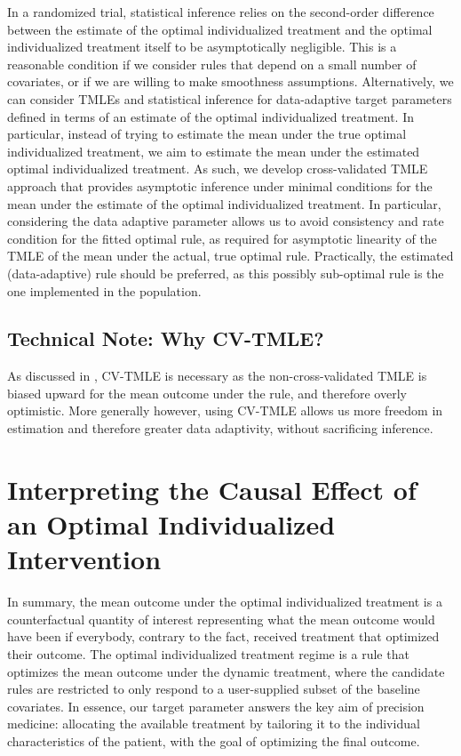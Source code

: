 \documentclass[
  12pt, krantz2,
]{krantz}
\newcommand{\1}{\mathbbm{1}}
\theoremstyle{definition}
\theoremstyle{definition}
\theoremstyle{definition}
\theoremstyle{definition}
\theoremstyle{remark}
\begin{document}
In a randomized trial, statistical inference relies on the second-order
difference between the estimate of the optimal individualized treatment and the
optimal individualized treatment itself to be asymptotically negligible. This is
a reasonable condition if we consider rules that depend on a small number of
covariates, or if we are willing to make smoothness assumptions. Alternatively,
we can consider TMLEs and statistical inference for data-adaptive target
parameters defined in terms of an estimate of the optimal individualized
treatment. In particular, instead of trying to estimate the mean under the true
optimal individualized treatment, we aim to estimate the mean under the
estimated optimal individualized treatment. As such, we develop cross-validated
TMLE approach that provides asymptotic inference under minimal conditions for
the mean under the estimate of the optimal individualized treatment. In
particular, considering the data adaptive parameter allows us to avoid
consistency and rate condition for the fitted optimal rule, as required for
asymptotic linearity of the TMLE of the mean under the actual, true optimal
rule. Practically, the estimated (data-adaptive) rule should be preferred, as
this possibly sub-optimal rule is the one implemented in the population.

\hypertarget{technical-note-why-cv-tmle}{%
\subsection{Technical Note: Why CV-TMLE?}\label{technical-note-why-cv-tmle}}

As discussed in \citet{vanderLaanLuedtke15}, CV-TMLE is necessary as the
non-cross-validated TMLE is biased upward for the mean outcome under the rule,
and therefore overly optimistic. More generally however, using CV-TMLE allows us
more freedom in estimation and therefore greater data adaptivity, without
sacrificing inference.

\hypertarget{interpreting-the-causal-effect-of-an-optimal-individualized-intervention}{%
\section{Interpreting the Causal Effect of an Optimal Individualized Intervention}\label{interpreting-the-causal-effect-of-an-optimal-individualized-intervention}}

In summary, the mean outcome under the optimal individualized treatment is a
counterfactual quantity of interest representing what the mean outcome would
have been if everybody, contrary to the fact, received treatment that optimized
their outcome. The optimal individualized treatment regime is a rule that
optimizes the mean outcome under the dynamic treatment, where the candidate
rules are restricted to only respond to a user-supplied subset of the baseline
covariates. In essence, our target parameter answers the key
aim of precision medicine: allocating the available treatment by tailoring it to
the individual characteristics of the patient, with the goal of optimizing the
final outcome.
\end{document}
